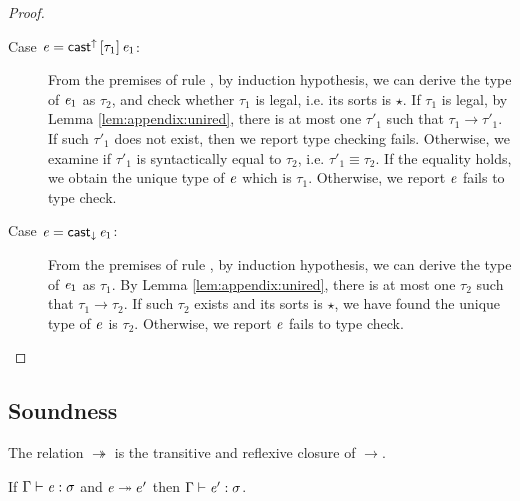 \begin{proof}
\begin{description}
		\item[Case $\mathit{e}=\mathsf{cast}^{\uparrow} \, [  \tau_{{\mathrm{1}}}  ] \,  \mathit{e_{{\mathrm{1}}}}$:] From the premises of rule , by induction hypothesis, we can derive the type of $\mathit{e_{{\mathrm{1}}}}$ as $\tau_{{\mathrm{2}}}$, and check whether $\tau_{{\mathrm{1}}}$ is legal, i.e. its sorts is $\star$. If $\tau_{{\mathrm{1}}}$ is legal, by Lemma \ref{lem:appendix:unired}, there is at most one $\tau'_{{\mathrm{1}}}$ such that $\tau_{{\mathrm{1}}}  \longrightarrow  \tau'_{{\mathrm{1}}}$. If such $\tau'_{{\mathrm{1}}}$ does not exist, then we report type checking fails. Otherwise, we examine if $\tau'_{{\mathrm{1}}}$ is syntactically equal to $\tau_{{\mathrm{2}}}$, i.e. $\tau'_{{\mathrm{1}}}  \equiv  \tau_{{\mathrm{2}}}$. If the equality holds, we obtain the unique type of $\mathit{e}$ which is $\tau_{{\mathrm{1}}}$. Otherwise, we report $\mathit{e}$ fails to type check.
		\item[Case $\mathit{e}=\mathsf{cast}_{\downarrow} \, \mathit{e_{{\mathrm{1}}}}$:] From the premises of rule , by induction hypothesis, we can derive the type of $\mathit{e_{{\mathrm{1}}}}$ as $\tau_{{\mathrm{1}}}$. By Lemma \ref{lem:appendix:unired}, there is at most one $\tau_{{\mathrm{2}}}$ such that $\tau_{{\mathrm{1}}}  \longrightarrow  \tau_{{\mathrm{2}}}$. If such $\tau_{{\mathrm{2}}}$ exists and its sorts is $\star$, we have found the unique type of $\mathit{e}$ is $\tau_{{\mathrm{2}}}$. Otherwise, we report $\mathit{e}$ fails to type check.
	\end{description}
\end{proof}

\subsection{Soundness}
\begin{dfn}
    The relation $ \twoheadrightarrow $ is the transitive and reflexive closure of $ \longrightarrow $.
\end{dfn}

\begin{lem}
If $\Gamma  \vdash  \mathit{e}  :  \sigma$ and $\mathit{e}  \twoheadrightarrow  e'$ then $\Gamma  \vdash  \mathit{e'}  :  \sigma$.
\end{lem}

